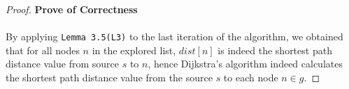 \documentclass[11pt, oneside]{article}   	%
\theoremstyle{definition}
\begin{document}
\begin{proof}\textbf{Prove of Correctness}
\\\\
By applying \texttt{Lemma 3.5(L3)} to the last iteration of the algorithm, we obtained that for all nodes $n$ in the explored list, $dist[n]$ is indeed the shortest path distance value from source $s$ to $n$, hence Dijkstra's algorithm indeed calculates the shortest path distance value from the source $s$ to each node $n \in g$. 
\end{proof}
\end{document}
